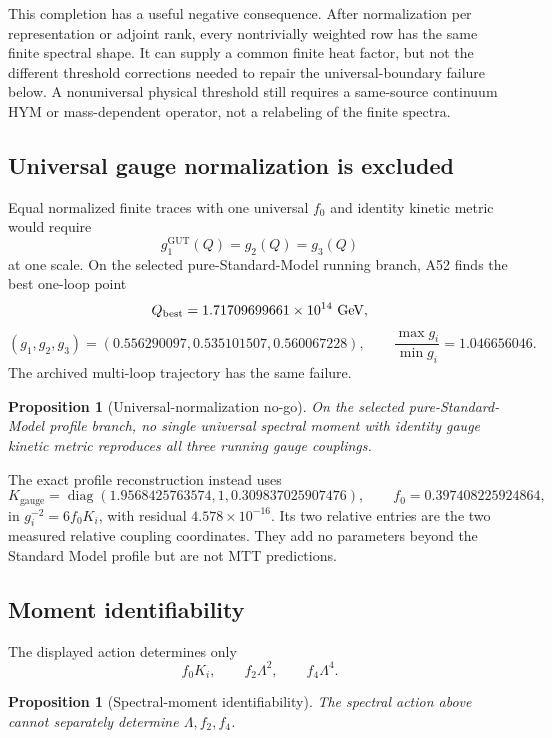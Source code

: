 \documentclass[11pt,a4paper,twoside]{article}
\theoremstyle{plain}
\newtheorem{proposition}[theorem]{Proposition}
\theoremstyle{definition}
\theoremstyle{remark}
\begin{document}
This completion has a useful negative consequence.  After normalization per
representation or adjoint rank, every nontrivially weighted row has the same
finite spectral shape.  It can supply a common finite heat factor, but not the
different threshold corrections needed to repair the universal-boundary
failure below.  A nonuniversal physical threshold still requires a
same-source continuum HYM or mass-dependent operator, not a relabeling of the
finite spectra.

\subsection{Universal gauge normalization is excluded}

Equal normalized finite traces with one universal $f_0$ and identity kinetic
metric would require
\[
 g_1^{\mathrm{GUT}}(Q)=g_2(Q)=g_3(Q)
\]
at one scale.  On the selected pure-Standard-Model running branch, A52 finds
the best one-loop point
\[
 Q_{\mathrm{best}}=1.71709699661\times10^{14}\ {\rm GeV},
\]
\[
 (g_1,g_2,g_3)
   =(0.556290097,0.535101507,0.560067228),
\qquad
 \frac{\max g_i}{\min g_i}=1.046656046.
\]
The archived multi-loop trajectory has the same failure.

\begin{proposition}[Universal-normalization no-go]
\label{prop:gauge-nogo}
On the selected pure-Standard-Model profile branch, no single universal
spectral moment with identity gauge kinetic metric reproduces all three
running gauge couplings.
\end{proposition}

The exact profile reconstruction instead uses
\[
 K_{\mathrm{gauge}}
   =\operatorname{diag}
     (1.9568425763574,1,0.309837025907476),
\qquad
 f_0=0.397408225924864,
\]
in $g_i^{-2}=6f_0K_i$, with residual $4.578\times10^{-16}$.  Its two
relative entries are the two measured relative coupling coordinates.  They
add no parameters beyond the Standard Model profile but are not MTT
predictions.

\subsection{Moment identifiability}

The displayed action determines only
\[
 f_0K_i,\qquad f_2\Lambda^2,\qquad f_4\Lambda^4.
\]

\begin{proposition}[Spectral-moment identifiability]
\label{prop:moments}
The spectral action above cannot separately determine
$\Lambda,f_2,f_4$.
\end{proposition}
\end{document}
